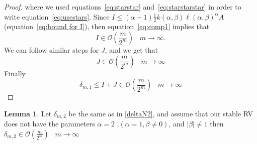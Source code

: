 \documentclass{article}
\theoremstyle{definition}
\newtheorem{lemma}[definition]{Lemma}
\begin{document}
\begin{proof}
where we used equations~\eqref{eq:starstar} and~\eqref{eq:starstarstar} in order to write equation~\eqref{eq:usestars}. Since $I 
\leq (\alpha+1)\frac{1}{2}k(\alpha,\beta)\ell(\alpha,\beta)^{\alpha} A$ (equation~\eqref{eq:bound for I}), then equation~\eqref{eq:comp1} implies that 
\begin{equation}
\label{eq:comp2}
I \in \mathcal{O}\left(\frac{m}{2^m}\right)\;\;\;m\to\infty.
\end{equation}
We can follow similar steps for $J$, and we get that 
\begin{equation}
J \in \mathcal{O}\left(\frac{m}{2^m}\right)\;\;\;m\to\infty 
\label{eq:comp3}
\end{equation}
Finally 
\begin{equation}
\delta_{m,1} \leq I+J\in\mathcal{O}\left(\frac{m}{2^m}\right)\;\;\;m\to\infty
\label{eq:comp4} 
\end{equation}
\end{proof}
\begin{lemma}
\label{lem:e3}Let $
 \delta_{m,2}$ be the same as in \eqref{deltaN2}, and assume that our stable RV does not have the parameters $\alpha=2$ ,$(\alpha=1,\beta\neq0)$, and  $\lvert \beta\rvert\neq1$ then $\delta_{m,2} \in\mathcal{O}\left( \frac{m}{2^m}\right)\;\;\;m\to\infty$
 \end{lemma}
\end{document}
